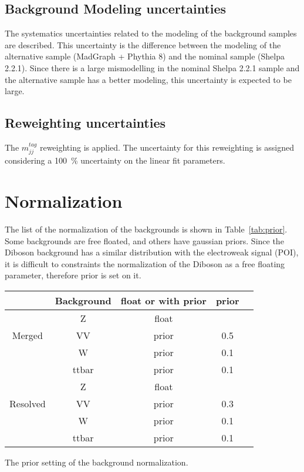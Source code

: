 \subsection{Background Modeling uncertainties}
The systematics uncertainties related to the modeling of the background samples are described. This uncertainty is the difference between the modeling of the alternative sample (MadGraph + Phythia 8)  and the nominal sample (Shelpa 2.2.1). Since there is a large mismodelling in the nominal Shelpa 2.2.1 sample and the alternative sample has a better modeling, this uncertainty is expected to be large.
\subsection{Reweighting uncertainties}
The $m^{tag}_{jj}$ reweighting is applied. The uncertainty for this reweighting is assigned considering a 100~\% uncertainty on the linear fit parameters. 

\section{Normalization}
The list of the normalization of the backgrounds is shown in Table~\ref{tab:prior}.
Some backgrounds are free floated, and others have gaussian priors. Since the Diboson background has a similar distribution with the electroweak signal (POI), it is difficult to constraints the normalization of the Diboson as a free floating parameter, therefore prior is set on it.
\begin{center}
\begin{tabular}{ |c|c|c|c|c| } 
\hline
 & Background & float or with prior & prior \\
\hline
\multirow{3}{4em}{Merged} & Z & float &       \\ 
& VV                          & prior &   0.5 \\ 
& W                           & prior &   0.1 \\ 
& ttbar                       & prior &   0.1 \\ 
\hline
\multirow{3}{4em}{Resolved} & Z & float &       \\ 
& VV                          & prior &   0.3 \\ 
& W                           & prior &   0.1 \\ 
& ttbar                       & prior &   0.1 \\ 
\hline
\end{tabular}
\caption{\label{tab:prior} The prior setting of the background normalization. }
\end{center}

